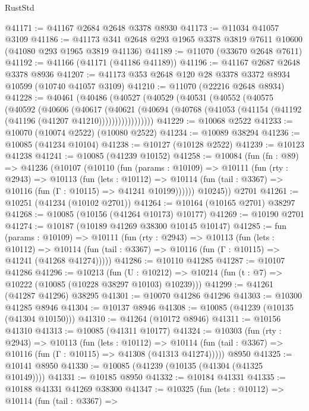 \begin{lexlean}{RustStd}
\begin{coremodule}
@41171 := @41167 @2684 @2648 @3378 @8930
@41173 := @11034 @41057 @3109
@41186 := @41173 @341 @2648 @293 @1965 @3378 @3819 @7611 @10600 (@41080 @293 @1965 @3819 @41136)
@41189 := @11070 (@33670 @2648 @7611)
@41192 := @41166 (@41171 (@41186 @41189))
@41196 := @41167 @2687 @2648 @3378 @8936
@41207 := @41173 @353 @2648 @120 @28 @3378 @3372 @8934 @10599 (@10740 @41057 @3109)
@41210 := @11070 (@22216 @2648 @8934)
@41228 := @40461
    (@40486
      (@40527
        (@40529
          (@40531
            (@40552
              (@40575
                (@40592
                  (@40606
                    (@40617
                      (@40621
                        (@40694
                          (@40768 (@41053 (@41154 (@41192 (@41196 (@41207 @41210)))))))))))))))))
@41229 := @10068 @2522
@41233 := @10070 (@10074 @2522) (@10080 @2522)
@41234 := @10089 @38294
@41236 := @10085 (@41234 @10104)
@41238 := @10127 (@10128 @2522)
@41239 := @10123 @41238
@41241 := @10085 (@41239 @10152)
@41258 := @10084
    (fun (fn : @89) =>
    @41236
      (@10107
        (@10110
          (fun (params : @10109) =>
          @10111
            (fun (rty : @2943) =>
            @10113
              (fun (lets : @10112) =>
              @10114 (fun (tail : @3367) => @10116 (fun (Γ : @10115) => @41241 @10199))))))
        @10245))
    @2701
@41261 := @10251 (@41234 (@10102 @2701))
@41264 := @10164 (@10165 @2701) @38297
@41268 := @10085 (@10156 (@41264 @10173) @10177)
@41269 := @10190 @2701
@41274 := @10187 (@10189 @41269 @38300 @10145 @10147)
@41285 := fun (params : @10109) =>
  @10111
    (fun (rty : @2943) =>
    @10113
      (fun (lets : @10112) =>
      @10114 (fun (tail : @3367) => @10116 (fun (Γ : @10115) => @41241 (@41268 @41274)))))
@41286 := @10110 @41285
@41287 := @10107 @41286
@41296 := @10213
    (fun (U : @10212) => @10214 (fun (t : @7) => @10222 (@10085 (@10228 @38297 @10103) @10239)))
@41299 := @41261 (@41287 @41296) @38295
@41301 := @10070 @41286 @41296
@41303 := @10300 @41285 @8946
@41304 := @10137 @8946
@41308 := @10085 (@41239 (@10135 (@41304 @10150)))
@41310 := @41264 (@10172 @8946)
@41311 := @10156 @41310
@41313 := @10085 (@41311 @10177)
@41324 := @10303
    (fun (rty : @2943) =>
    @10113
      (fun (lets : @10112) =>
      @10114 (fun (tail : @3367) => @10116 (fun (Γ : @10115) => @41308 (@41313 @41274)))))
    @8950
@41325 := @10141 @8950
@41330 := @10085 (@41239 (@10135 (@41304 (@41325 @10149))))
@41331 := @10185 @8950
@41332 := @10184 @41331
@41335 := @10188 @41331 @41269 @38300
@41347 := @10325
    (fun (lets : @10112) =>
    @10114
      (fun (tail : @3367) =>

\end{coremodule}
\end{lexlean}

